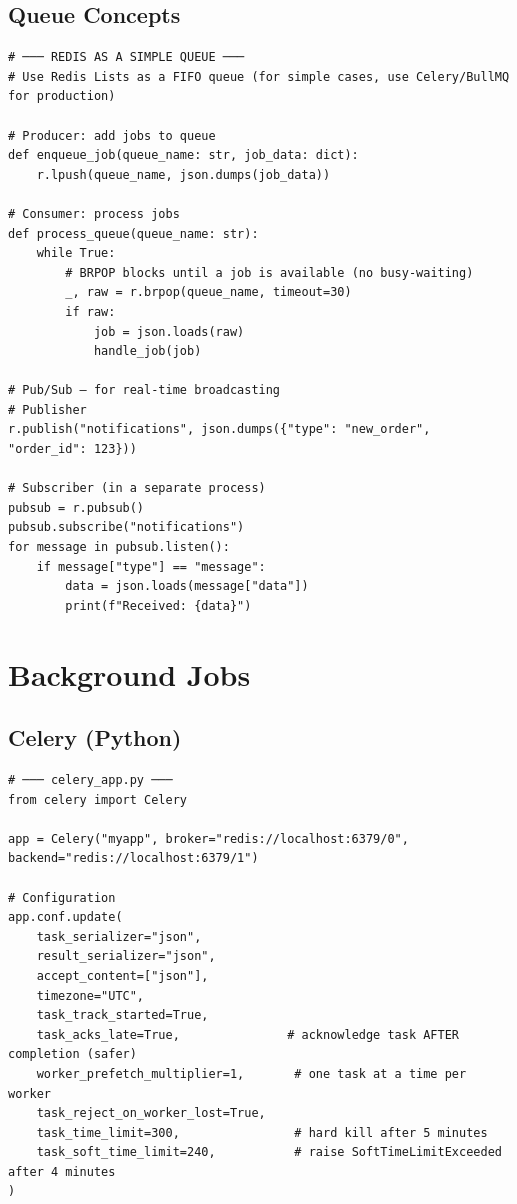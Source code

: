 \documentclass[10pt, a4paper]{article}
\begin{document}
\subsection{Queue Concepts}


\begin{lstlisting}[language=mypython]
# ─── REDIS AS A SIMPLE QUEUE ───
# Use Redis Lists as a FIFO queue (for simple cases, use Celery/BullMQ for production)

# Producer: add jobs to queue
def enqueue_job(queue_name: str, job_data: dict):
    r.lpush(queue_name, json.dumps(job_data))

# Consumer: process jobs
def process_queue(queue_name: str):
    while True:
        # BRPOP blocks until a job is available (no busy-waiting)
        _, raw = r.brpop(queue_name, timeout=30)
        if raw:
            job = json.loads(raw)
            handle_job(job)

# Pub/Sub — for real-time broadcasting
# Publisher
r.publish("notifications", json.dumps({"type": "new_order", "order_id": 123}))

# Subscriber (in a separate process)
pubsub = r.pubsub()
pubsub.subscribe("notifications")
for message in pubsub.listen():
    if message["type"] == "message":
        data = json.loads(message["data"])
        print(f"Received: {data}")
\end{lstlisting}


\bigskip


\section{Background Jobs}


\subsection{Celery (Python)}


\begin{lstlisting}[language=mypython]
# ─── celery_app.py ───
from celery import Celery

app = Celery("myapp", broker="redis://localhost:6379/0", backend="redis://localhost:6379/1")

# Configuration
app.conf.update(
    task_serializer="json",
    result_serializer="json",
    accept_content=["json"],
    timezone="UTC",
    task_track_started=True,
    task_acks_late=True,               # acknowledge task AFTER completion (safer)
    worker_prefetch_multiplier=1,       # one task at a time per worker
    task_reject_on_worker_lost=True,
    task_time_limit=300,                # hard kill after 5 minutes
    task_soft_time_limit=240,           # raise SoftTimeLimitExceeded after 4 minutes
)
\end{lstlisting}
\end{document}
